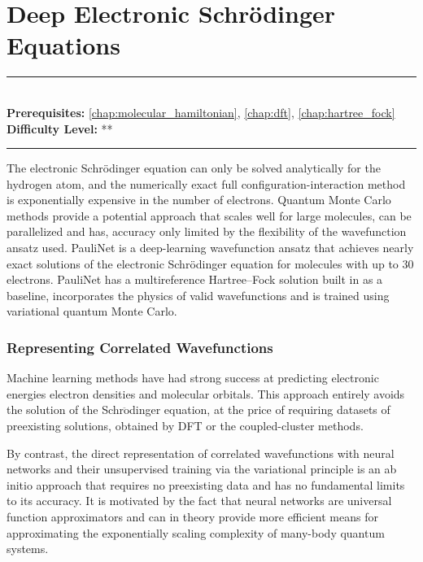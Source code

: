\documentclass[book.tex]{subfiles}
\begin{document}
\chapter{Deep Electronic Schr\"{o}dinger Equations}
\label{chap:deep_schrodinger}
\noindent\rule{11cm}{0.4pt} \\
\textbf{Prerequisites:} \autoref{chap:molecular_hamiltonian}, \autoref{chap:dft}, \autoref{chap:hartree_fock} \\
\textbf{Difficulty Level:} ** \\
\noindent\rule{11cm}{0.4pt}
\vspace{5mm}



The electronic Schrödinger equation can only be solved analytically for the hydrogen atom, and the numerically exact full configuration-interaction method is exponentially expensive in the number of electrons. Quantum Monte Carlo methods provide a potential approach that scales well for large molecules, can be parallelized and has, accuracy only limited by the flexibility of the wavefunction ansatz used. PauliNet \cite{foulkes2001quantum} \cite{hermann2020deep} is a deep-learning wavefunction ansatz that achieves nearly exact solutions of the electronic Schrödinger equation for molecules with up to 30 electrons. PauliNet has a multireference Hartree–Fock solution built in as a baseline, incorporates the physics of valid wavefunctions and is trained using variational quantum Monte Carlo. 

\subsection{Representing Correlated Wavefunctions}
Machine learning methods have had strong success at predicting electronic energies electron densities and molecular orbitals. This approach entirely avoids the solution of the Schr$\mathrm{\ddot{o}}$dinger equation, at the price of requiring datasets of preexisting solutions, obtained by DFT or the coupled-cluster methods.

By contrast, the direct representation of correlated wavefunctions with neural networks and their unsupervised training via the variational principle 
is an ab initio approach that requires no preexisting data and has no fundamental limits to its accuracy. It is motivated by the fact that neural networks are universal function approximators and can in theory provide more efficient means for approximating the exponentially scaling complexity of many-body quantum systems. %
\end{document}
